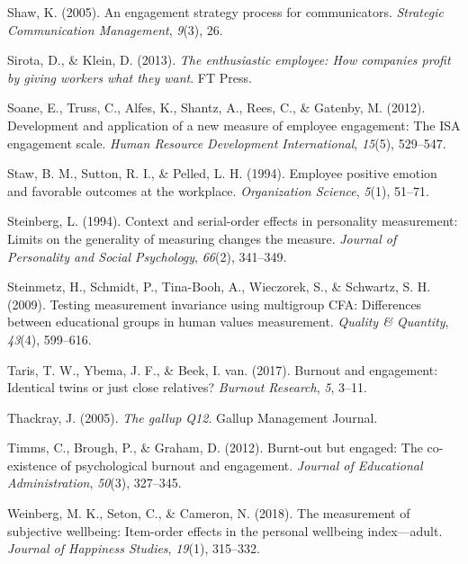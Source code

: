 \documentclass[
  man]{apa6}
\newlength{\cslhangindent}
\newlength{\cslentryspacingunit} %
\newenvironment{CSLReferences}[2] %
 {%
  \setlength{\parindent}{0pt}
  \ifodd #1
  \let\oldpar\par
  \def\par{\hangindent=\cslhangindent\oldpar}
  \fi
  \setlength{\parskip}{#2\cslentryspacingunit}
 }%
 {}
\begin{document}
\begin{CSLReferences}{1}{0}
\leavevmode{}%
Shaw, K. (2005). An engagement strategy process for communicators. \emph{Strategic Communication Management}, \emph{9}(3), 26.

\leavevmode{}%
Sirota, D., \& Klein, D. (2013). \emph{The enthusiastic employee: How companies profit by giving workers what they want}. FT Press.

\leavevmode{}%
Soane, E., Truss, C., Alfes, K., Shantz, A., Rees, C., \& Gatenby, M. (2012). Development and application of a new measure of employee engagement: The ISA engagement scale. \emph{Human Resource Development International}, \emph{15}(5), 529--547.

\leavevmode{}%
Staw, B. M., Sutton, R. I., \& Pelled, L. H. (1994). Employee positive emotion and favorable outcomes at the workplace. \emph{Organization Science}, \emph{5}(1), 51--71.

\leavevmode{}%
Steinberg, L. (1994). Context and serial-order effects in personality measurement: Limits on the generality of measuring changes the measure. \emph{Journal of Personality and Social Psychology}, \emph{66}(2), 341--349.

\leavevmode{}%
Steinmetz, H., Schmidt, P., Tina-Booh, A., Wieczorek, S., \& Schwartz, S. H. (2009). Testing measurement invariance using multigroup CFA: Differences between educational groups in human values measurement. \emph{Quality \& Quantity}, \emph{43}(4), 599--616.

\leavevmode{}%
Taris, T. W., Ybema, J. F., \& Beek, I. van. (2017). Burnout and engagement: Identical twins or just close relatives? \emph{Burnout Research}, \emph{5}, 3--11.

\leavevmode{}%
Thackray, J. (2005). \emph{The gallup Q12}. Gallup Management Journal.

\leavevmode{}%
Timms, C., Brough, P., \& Graham, D. (2012). Burnt-out but engaged: The co-existence of psychological burnout and engagement. \emph{Journal of Educational Administration}, \emph{50}(3), 327--345.

\leavevmode{}%
Weinberg, M. K., Seton, C., \& Cameron, N. (2018). The measurement of subjective wellbeing: Item-order effects in the personal wellbeing index---adult. \emph{Journal of Happiness Studies}, \emph{19}(1), 315--332.

\end{CSLReferences}

\endgroup
\end{document}
